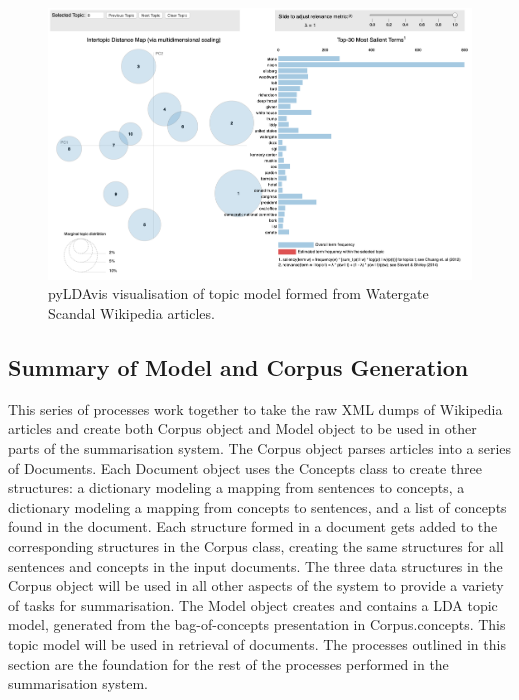 \begin{figure}[h]
    \centering
         \includegraphics[width=1.0\textwidth]{Figures/ldamodel.png}
          \caption{pyLDAvis visualisation of topic model formed from Watergate Scandal Wikipedia articles.}
           \label{topicModel}
\end{figure}

\subsection{Summary of Model and Corpus Generation}
This series of processes work together to take the raw XML dumps of Wikipedia articles and create both Corpus object and Model object to be used in other parts of the summarisation system. The Corpus object parses articles into a series of Documents. Each Document object uses the Concepts class to create three structures: a dictionary modeling a mapping from sentences to concepts, a dictionary modeling a mapping from concepts to sentences, and a list of concepts found in the document. Each structure formed in a document gets added to the corresponding structures in the Corpus class, creating the same structures for all sentences and concepts in the input documents. The three data structures in the Corpus object will be used in all other aspects of the system to provide a variety of tasks for summarisation. The Model object creates and contains a LDA topic model, generated from the bag-of-concepts presentation in Corpus.concepts. This topic model will be used in retrieval of documents. The processes outlined in this section are the foundation for the rest of the processes performed in the summarisation system.


